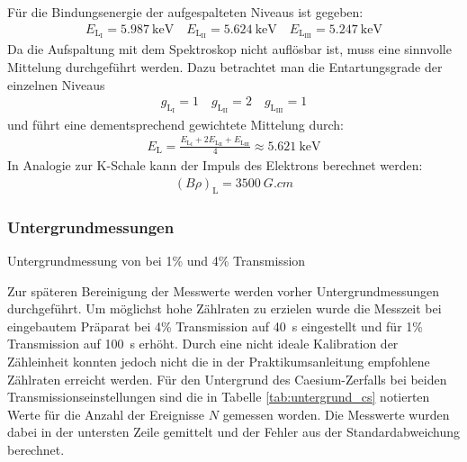 \documentclass[11pt, a4paper]{article}
\numberwithin{equation}{section}
\begin{document}
Für die Bindungsenergie der aufgespalteten Niveaus ist gegeben:
\begin{align*}
E_{\mathrm{L}_{\mathrm{I}}} = \SI{5,987}{\kilo\electronvolt} \quad
E_{\mathrm{L}_{\mathrm{II}}} = \SI{5,624}{\kilo\electronvolt} \quad
E_{\mathrm{L}_{\mathrm{III}}} = \SI{5,247}{\kilo\electronvolt}
\end{align*}
Da die Aufspaltung mit dem Spektroskop nicht auflösbar ist, muss eine sinnvolle Mittelung durchgeführt werden.
Dazu betrachtet man die Entartungsgrade der einzelnen Niveaus
\begin{align*}
g_{\mathrm{L}_{\mathrm{I}}} = \num{1} \quad
g_{\mathrm{L}_{\mathrm{II}}} = \num{2} \quad
g_{\mathrm{L}_{\mathrm{III}}} = \num{1}
\end{align*}
und führt eine dementsprechend gewichtete Mittelung durch:
\begin{align*}
E_\mathrm{L} = \frac{E_{\mathrm{L}_{\mathrm{I}}} + 2E_{\mathrm{L}_{\mathrm{II}}} + E_{\mathrm{L}_{\mathrm{III}}}}{4} \approx \SI{5,621}{\kilo\electronvolt}
\end{align*}
In Analogie zur K-Schale kann der Impuls des Elektrons berechnet werden:
\begin{align*}
\left(B \rho \right)_\mathrm{L} = \SI{3500}{G.cm}
\end{align*}

\subsubsection{Untergrundmessungen}
\label{sssec:untergrund1}
\begin{table}
	\centering
	
	\caption{Untergrundmessung von  bei 1\% und 4\% Transmission}
	\label{tab:untergrund_cs}
\end{table}
Zur späteren Bereinigung der Messwerte werden vorher Untergrundmessungen durchgeführt.
Um möglichst hohe Zählraten zu erzielen wurde die Messzeit bei eingebautem Präparat bei 4\% Transmission auf \SI{40}{\second} eingestellt und für 1\% Transmission auf \SI{100}{\second} erhöht.
Durch eine nicht ideale Kalibration der Zähleinheit konnten jedoch nicht die in der Praktikumsanleitung empfohlene Zählraten erreicht werden.
Für den Untergrund des Caesium-Zerfalls bei beiden Transmissionseinstellungen sind die in Tabelle \ref{tab:untergrund_cs} notierten Werte für die Anzahl der Ereignisse $N$ gemessen worden.
Die Messwerte wurden dabei in der untersten Zeile gemittelt und der Fehler aus der Standardabweichung berechnet.
\end{document}
